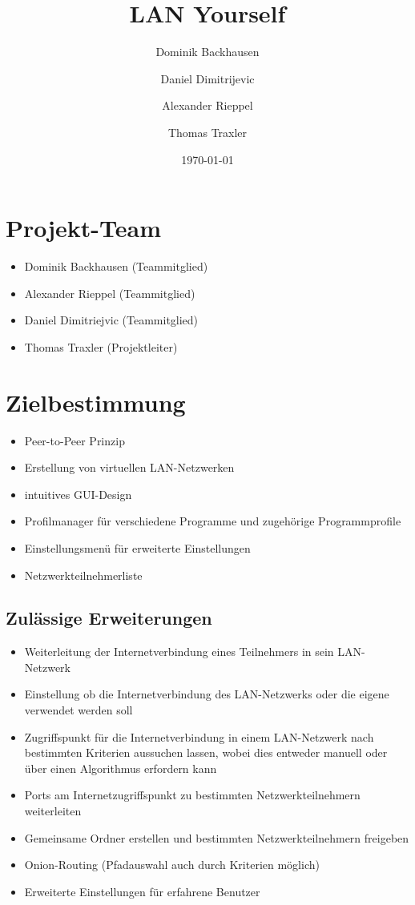 \documentclass[a4paper,12pt]{scrreprt}
\begin{document}
\author{Dominik Backhausen \and Daniel Dimitrijevic \and Alexander Rieppel \and Thomas Traxler}
\subject{Pflichtenheft}
\title{LAN Yourself}
\date{\today}
\maketitle
\tableofcontents

\chapter{Projekt-Team}
	\begin{itemize}
	\item Dominik Backhausen (Teammitglied)
	\item Alexander Rieppel (Teammitglied)
	\item Daniel Dimitriejvic (Teammitglied)
	\item Thomas Traxler (Projektleiter)
	\end{itemize}
	
	
\chapter{Zielbestimmung}
	\begin{itemize}
	\item Peer-to-Peer Prinzip
	\item Erstellung von virtuellen LAN-Netzwerken
	\item intuitives GUI-Design
	\item Profilmanager für verschiedene Programme und zugehörige Programmprofile
	\item Einstellungsmenü für erweiterte Einstellungen
	\item Netzwerkteilnehmerliste
	\end{itemize}
	
	\section{Zulässige Erweiterungen}
	
	\begin{itemize}
	\item Weiterleitung der Internetverbindung eines Teilnehmers in sein LAN-Netzwerk
	\item Einstellung ob die Internetverbindung des LAN-Netzwerks oder die eigene verwendet werden soll
	\item Zugriffspunkt für die Internetverbindung in einem LAN-Netzwerk nach bestimmten Kriterien aussuchen lassen, wobei dies entweder manuell oder über einen Algorithmus erfordern kann
	\item Ports am Internetzugriffspunkt zu bestimmten Netzwerkteilnehmern weiterleiten
	\item Gemeinsame Ordner erstellen und bestimmten Netzwerkteilnehmern freigeben
	\item Onion-Routing (Pfadauswahl auch durch Kriterien möglich)
	\item Erweiterte Einstellungen für erfahrene Benutzer
	
	\end{itemize}
	
\end{document}

